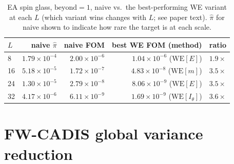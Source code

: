 \documentclass[11pt]{article}
\begin{document}
\begin{table}[h]
	\centering\small
	\caption{EA spin glass, $\mathrm{beyond}=1$, naive vs.\ the best-performing WE variant at
		each $L$ (which variant wins changes with $L$; see paper text). $\hat\pi$ for naive shown
		to indicate how rare the target is at each scale.}
	\label{tab:lscaling}
	\begin{tabular}{lrrrr}
		\toprule
		$L$ & naive $\hat\pi$ & naive FOM & best WE FOM (method) & ratio \\
		\midrule
		8 & $1.79\times10^{-4}$ & $2.00\times10^{-6}$ & $1.04\times10^{-6}$ ($\mathrm{WE}[E]$) & $1.9\times$ \\
		16 & $5.18\times10^{-5}$ & $1.72\times10^{-7}$ & $4.83\times10^{-8}$ ($\mathrm{WE}[m]$) & $3.5\times$ \\
		24 & $1.30\times10^{-5}$ & $2.79\times10^{-8}$ & $8.06\times10^{-9}$ ($\mathrm{WE}[E]$) & $3.5\times$ \\
		32 & $4.17\times10^{-6}$ & $6.11\times10^{-9}$ & $1.69\times10^{-9}$ ($\mathrm{WE}[I_\theta]$) & $3.6\times$ \\
		\bottomrule
	\end{tabular}
\end{table}

\section{FW-CADIS global variance reduction}
\end{document}
